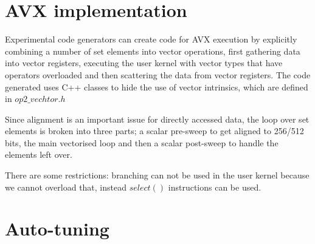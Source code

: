 \documentclass[11pt]{article}
\begin{document}
%
%
%
%
%



\newpage

\section{AVX implementation}

Experimental code generators can create code for AVX execution
by explicitly combining a number of set elements into vector operations,
first gathering data into vector registers, executing the user kernel with
vector types that have operators overloaded and then scattering the
data from vector registers. The code generated uses C++ classes to
hide the use of vector intrinsics, which are defined in $op2\_vechtor.h$

Since alignment is an important issue for directly accessed data, the loop
over set elements is broken into three parts; a scalar pre-sweep to get aligned
to 256/512 bits, the main vectorised loop and then a scalar post-sweep
to handle the elements left over.

There are some restrictions: branching can not be used in the user kernel
because we cannot overload that, instead $select()$ instructions can be
used.
\newpage

\section{Auto-tuning}
\end{document}
